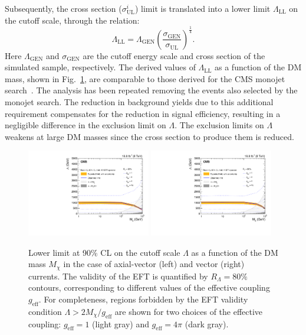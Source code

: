 Subsequently, the cross section ($\sigma^{i}_{\mathrm{UL}}$) limit is translated into a lower limit $\Lambda_{\mathrm{LL}}$ on
the cutoff scale, through the relation:
\begin{equation}
\Lambda_\mathrm{LL} = \Lambda_\text{GEN} \left(\frac{\sigma_\text{GEN}}{\sigma_\mathrm{UL}}\right)^\frac{1}{4}.
\end{equation}
Here $\Lambda_\text{GEN}$ and $\sigma_\text{GEN}$ are the cutoff
energy scale and cross section of the simulated sample, respectively.
The derived values of $\Lambda_\mathrm{LL}$ as a function of the DM mass,
shown in Fig.~\ref{fig:LambdaLimit}, are comparable to those derived
for the CMS monojet search~\cite{monojet8TeV}.  The analysis has been
repeated removing the events also selected by the monojet search.  The
reduction in background yields due to this additional requirement
compensates for the reduction in signal efficiency, resulting in a
negligible difference in the exclusion limit on $\Lambda$. The
exclusion limits on $\Lambda$ weakens at large DM masses since the
cross section to produce them is reduced.
\begin{figure}
\centering
\includegraphics[width=0.48\textwidth, angle=0.]{Limits/Final_av_Lambda_VarCoupling_80Percent_vNov9_2015_CWR.pdf}
\includegraphics[width=0.48\textwidth]{Limits/Final_v_Lambda_VarCoupling_80Percent_vNov9_2015_CWR.pdf}
\caption{Lower limit at 90\% CL on the cutoff scale $\Lambda$ as a
  function of the DM mass $M_\chi$ in the case of
  axial-vector (left) and vector (right) currents. The validity of the EFT
  is quantified by $R_\Lambda = 80\%$ contours, corresponding to
  different values of the effective coupling
  $g_\text{eff}$. For completeness, regions forbidden by the
  EFT validity condition $\Lambda > 2M_\chi/g_\text{eff}$  are shown for two choices of the
effective coupling:  $g_\text{eff} = 1$ (light gray) and $g_\text{eff}= 4\pi$ (dark gray).\label{fig:LambdaLimit}}
\end{figure}

